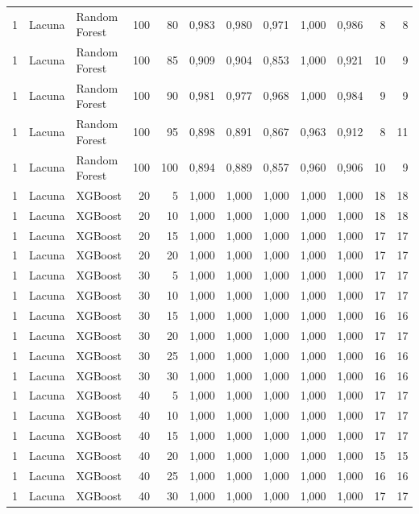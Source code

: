 \begin{longtable}{@{}rllrrrrrrrrr@{}}
1 & Lacuna & Random Forest & 100 & 80 & 0,983 & 0,980 & 0,971 & 1,000 & 0,986 & 8 & 8 \\
1 & Lacuna & Random Forest & 100 & 85 & 0,909 & 0,904 & 0,853 & 1,000 & 0,921 & 10 & 9 \\
1 & Lacuna & Random Forest & 100 & 90 & 0,981 & 0,977 & 0,968 & 1,000 & 0,984 & 9 & 9 \\
1 & Lacuna & Random Forest & 100 & 95 & 0,898 & 0,891 & 0,867 & 0,963 & 0,912 & 8 & 11 \\
1 & Lacuna & Random Forest & 100 & 100 & 0,894 & 0,889 & 0,857 & 0,960 & 0,906 & 10 & 9 \\
1 & Lacuna & XGBoost & 20 & 5 & 1,000 & 1,000 & 1,000 & 1,000 & 1,000 & 18 & 18 \\
1 & Lacuna & XGBoost & 20 & 10 & 1,000 & 1,000 & 1,000 & 1,000 & 1,000 & 18 & 18 \\
1 & Lacuna & XGBoost & 20 & 15 & 1,000 & 1,000 & 1,000 & 1,000 & 1,000 & 17 & 17 \\
1 & Lacuna & XGBoost & 20 & 20 & 1,000 & 1,000 & 1,000 & 1,000 & 1,000 & 17 & 17 \\
1 & Lacuna & XGBoost & 30 & 5 & 1,000 & 1,000 & 1,000 & 1,000 & 1,000 & 17 & 17 \\
1 & Lacuna & XGBoost & 30 & 10 & 1,000 & 1,000 & 1,000 & 1,000 & 1,000 & 17 & 17 \\
1 & Lacuna & XGBoost & 30 & 15 & 1,000 & 1,000 & 1,000 & 1,000 & 1,000 & 16 & 16 \\
1 & Lacuna & XGBoost & 30 & 20 & 1,000 & 1,000 & 1,000 & 1,000 & 1,000 & 17 & 17 \\
1 & Lacuna & XGBoost & 30 & 25 & 1,000 & 1,000 & 1,000 & 1,000 & 1,000 & 16 & 16 \\
1 & Lacuna & XGBoost & 30 & 30 & 1,000 & 1,000 & 1,000 & 1,000 & 1,000 & 16 & 16 \\
1 & Lacuna & XGBoost & 40 & 5 & 1,000 & 1,000 & 1,000 & 1,000 & 1,000 & 17 & 17 \\
1 & Lacuna & XGBoost & 40 & 10 & 1,000 & 1,000 & 1,000 & 1,000 & 1,000 & 17 & 17 \\
1 & Lacuna & XGBoost & 40 & 15 & 1,000 & 1,000 & 1,000 & 1,000 & 1,000 & 17 & 17 \\
1 & Lacuna & XGBoost & 40 & 20 & 1,000 & 1,000 & 1,000 & 1,000 & 1,000 & 15 & 15 \\
1 & Lacuna & XGBoost & 40 & 25 & 1,000 & 1,000 & 1,000 & 1,000 & 1,000 & 16 & 16 \\
1 & Lacuna & XGBoost & 40 & 30 & 1,000 & 1,000 & 1,000 & 1,000 & 1,000 & 17 & 17 \\

\end{longtable}
